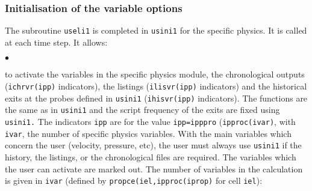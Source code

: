 {{{%
\subsubsection {Initialisation of the variable options}
\label{prg_useli1}%

The subroutine \texttt{useli1} is completed in \texttt{usini1} for the specific
 physics. It is called at each time step. It allows:
\begin{list}{$\bullet$}{}
\item to activate the variables in the specific physics module, the chronological
outputs (\texttt{ichrvr(ipp)} indicators), the listings (\texttt{ilisvr(ipp)}
indicators) and the
historical exits at the probes defined in \texttt{usini1} (\texttt{ihisvr(ipp)}
indicators).
The functions are the same as in \texttt{usini1} and the script frequency of the
exits are fixed using \texttt{usini1.} The indicators \texttt{ipp} are for the
 value \texttt{ipp=ipppro} (\texttt{ipproc(ivar)}, with \texttt{ivar}, the number
 of specific physics variables. With the main variables
 which concern the user (velocity, pressure, etc), the user must always use
 \texttt{usini1} if the history, the listings, or the chronological files are required.
 The variables which the user can activate are marked out. The number of variables in
the calculation is given in \texttt{ivar} (defined by
\texttt{propce(iel,ipproc(iprop)} for cell \texttt{iel}):


\end{list}}}}
